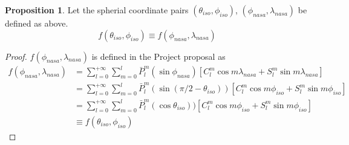 \documentclass[a4paper]{article}
\theoremstyle{definition}
\newtheorem{proposition}{Proposition}
\begin{document}
\begin{proposition} Let the spherial coordinate pairs $(\theta_{iso}, \phi_{iso})$, $(\phi_{nasa}, \lambda_{nasa})$ be defined as above. 
    \begin{equation*}
        f(\theta_{iso}, \phi_{iso}) \equiv f(\phi_{nasa}, \lambda_{nasa})
    \end{equation*}

    
\end{proposition}



\begin{proof}
    $f(\phi_{nasa}, \lambda_{nasa})$ is defined in the Project proposal as 
    \begin{align} \label{eq:project_def} 
        f(\phi_{nasa}, \lambda_{nasa}) &= \sum_{l = 0}^{+\infty}\sum_{m = 0}^l \bar P_l^m(\sin\phi_{nasa})[C_l^m\cos m\lambda_{nasa} + S_l^m \sin m \lambda_{nasa}] \\ 
                                       &= \sum_{l = 0}^{+\infty}\sum_{m = 0}^l \bar P_l^m(\sin(\pi/2 - \theta_{iso}))[C_l^m\cos m\phi_{iso} + S_l^m \sin m \phi_{iso}] \\
                                       &= \sum_{l = 0}^{+\infty}\sum_{m = 0}^l \bar P_l^m(\cos\theta_{iso}))[C_l^m\cos m\phi_{iso} + S_l^m \sin m \phi_{iso}] \\
                                       &\equiv f(\theta_{iso}, \phi_{iso})
    \end{align}

\end{proof}

\nocite{*}



\end{document}
